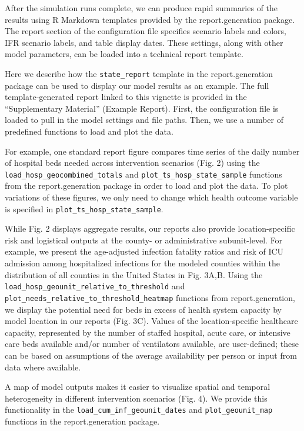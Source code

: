 After the simulation runs complete, we can produce rapid summaries of the results using R Markdown templates provided by the report.generation package. The report section of the configuration file specifies scenario labels and colors, IFR scenario labels, and table display dates. These settings, along with other model parameters, can be loaded into a technical report template.

Here we describe how the \verb|state_report| template in the report.generation package can be used to display our model results as an example. The full template-generated report linked to this vignette is provided in the “Supplementary Material” (Example Report). First, the configuration file is loaded to pull in the model settings and file paths. Then, we use a number of predefined functions to load and plot the data.

For example, one standard report figure compares time series of the daily number of hospital beds needed across intervention scenarios (Fig. 2) using the \verb|load_hosp_geocombined_totals| and \verb|plot_ts_hosp_state_sample| functions from the report.generation package in order to load and plot the data. To plot variations of these figures, we only need to change which health outcome variable is specified in \verb|plot_ts_hosp_state_sample|.

While Fig. 2 displays aggregate results, our reports also provide location-specific risk and logistical outputs at the county- or administrative subunit-level. For example, we present the age-adjusted infection fatality ratios and risk of ICU admission among hospitalized infections for the modeled counties within the distribution of all counties in the United States in Fig. 3A,B. Using the \verb|load_hosp_geounit_relative_to_threshold| and \verb|plot_needs_relative_to_threshold_heatmap| functions from report.generation, we display the potential need for beds in excess of health system capacity by model location in our reports (Fig. 3C). Values of the location-specific healthcare capacity, represented by the number of staffed hospital, acute care, or intensive care beds available and/or number of ventilators available, are user-defined; these can be based on assumptions of the average availability per person or input from data where available.

A map of model outputs makes it easier to visualize spatial and temporal heterogeneity in different intervention scenarios (Fig. 4). We provide this functionality in the \verb|load_cum_inf_geounit_dates| and \verb|plot_geounit_map| functions in the report.generation package.

